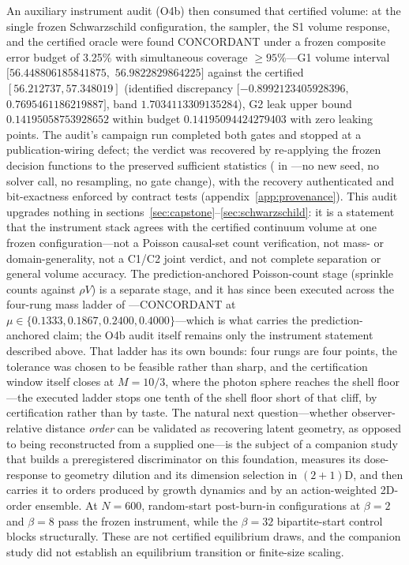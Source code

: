 An auxiliary instrument audit (O4b) then consumed that certified volume: at
the single frozen Schwarzschild configuration, the sampler, the S1 volume
response, and the certified oracle were found CONCORDANT under a frozen
composite error budget of 3.25\% with simultaneous coverage $\ge 95\%$---G1
volume interval $[56.448806185841875,$ $56.9822829864225]$ against the
certified $[56.212737, 57.348019]$ (identified discrepancy
$[-0.8992123405928396,$ $0.7695461186219887]$, band $1.7034113309135284$), G2
leak upper bound $0.14195058753928652$ within budget $0.14195094424279403$
with zero leaking points. The audit's campaign run completed both gates and
stopped at a publication-wiring defect; the verdict was recovered by
re-applying the frozen decision functions to the preserved sufficient
statistics ( in
---no new seed, no solver call,
no resampling, no gate change), with the recovery authenticated and
bit-exactness enforced by contract tests (appendix~\ref{app:provenance}).
This audit upgrades nothing in
sections~\ref{sec:capstone}--\ref{sec:schwarzschild}: it is a statement that
the instrument stack agrees with the certified continuum volume at one frozen
configuration---not a Poisson causal-set count verification, not mass- or
domain-generality, not a C1/C2 joint verdict, and not complete separation or
general volume accuracy. The prediction-anchored Poisson-count stage
(sprinkle counts against $\rho V$) is a separate stage, and it has since been
executed across the four-rung mass ladder of ---CONCORDANT
at $\mu \in \{0.1333, 0.1867, 0.2400, 0.4000\}$---which is what carries the
prediction-anchored claim; the O4b audit itself remains only the instrument
statement described above. That ladder has its own bounds: four rungs are
four points, the tolerance was chosen to be feasible rather than sharp, and
the certification window itself closes at $M = 10/3$, where the photon
sphere reaches the shell floor---the executed ladder stops one tenth of the
shell floor short of that cliff, by certification rather than by taste. The
natural next question---whether observer-relative distance \emph{order} can
be validated as recovering latent geometry, as opposed to being
reconstructed from a supplied one---is the subject of a companion study that
builds a preregistered discriminator on this foundation, measures its
dose-response to geometry dilution and its dimension selection in
$(2{+}1)$D, and then carries it to orders produced by growth dynamics and by
an action-weighted 2D-order ensemble. At $N = 600$, random-start
post-burn-in configurations at $\beta = 2$ and $\beta = 8$ pass the frozen
instrument, while the $\beta = 32$ bipartite-start control blocks
structurally. These are not certified equilibrium draws, and the companion
study did not establish an equilibrium transition or finite-size scaling.

